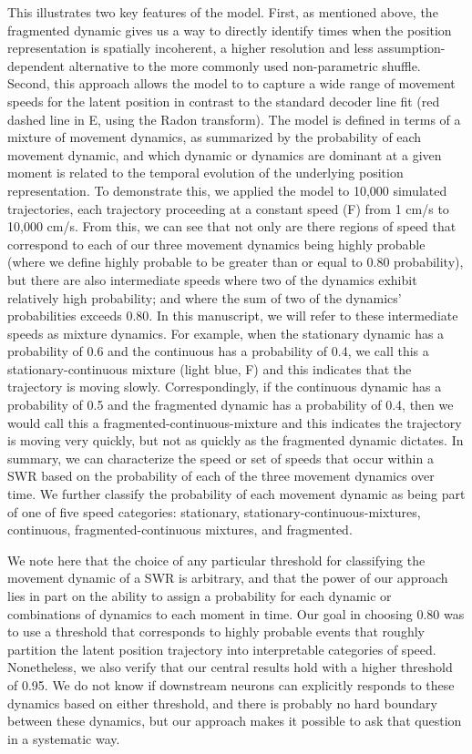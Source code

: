 \documentclass[9pt,lineno]{elife}
\begin{document}
This illustrates two key features of the model. First, as mentioned above, the fragmented dynamic gives us a way to directly identify times when the position representation is spatially incoherent, a higher resolution and less assumption-dependent alternative to the more commonly used non-parametric shuffle. Second, this approach allows the model to to capture a wide range of movement speeds for the latent position in contrast to the standard decoder line fit (red dashed line in E, using the Radon transform). The model is defined in terms of a mixture of movement dynamics, as summarized by the probability of each movement dynamic, and which dynamic or dynamics are dominant at a given moment is related to the temporal evolution of the underlying position representation. To demonstrate this, we applied the model to 10,000 simulated trajectories, each trajectory proceeding at a constant speed (F) from 1 cm/s to 10,000 cm/s. From this, we can see that not only are there regions of speed that correspond to each of our three movement dynamics being highly probable (where we define highly probable to be greater than or equal to 0.80 probability), but there are also intermediate speeds where two of the dynamics exhibit relatively high probability; and where the sum of two of the dynamics' probabilities exceeds 0.80. In this manuscript, we will refer to these intermediate speeds as mixture dynamics. For example, when the stationary dynamic has a probability of 0.6 and the continuous has a probability of 0.4, we call this a stationary-continuous mixture (light blue, F) and this indicates that the trajectory is moving slowly. Correspondingly, if the continuous dynamic has a probability of 0.5 and the fragmented dynamic has a probability of 0.4, then we would call this a fragmented-continuous-mixture and this indicates the trajectory is moving very quickly, but not as quickly as the fragmented dynamic dictates. In summary, we can characterize the speed or set of speeds that occur within a SWR based on the probability of each of the three movement dynamics over time. We further classify the probability of each movement dynamic as being part of one of five speed categories: stationary, stationary-continuous-mixtures, continuous, fragmented-continuous mixtures, and fragmented.

We note here that the choice of any particular threshold for classifying the movement dynamic of a SWR is arbitrary, and that the power of our approach lies in part on the ability to assign a probability for each dynamic or combinations of dynamics to each moment in time. Our goal in choosing 0.80 was to use a threshold that corresponds to highly probable events that roughly partition the latent position trajectory into interpretable categories of speed. Nonetheless, we also verify that our central results hold with a higher threshold of 0.95. We do not know if downstream neurons can explicitly responds to these dynamics based on either threshold, and there is probably no hard boundary between these dynamics, but our approach makes it possible to ask that question in a systematic way.
\end{document}
